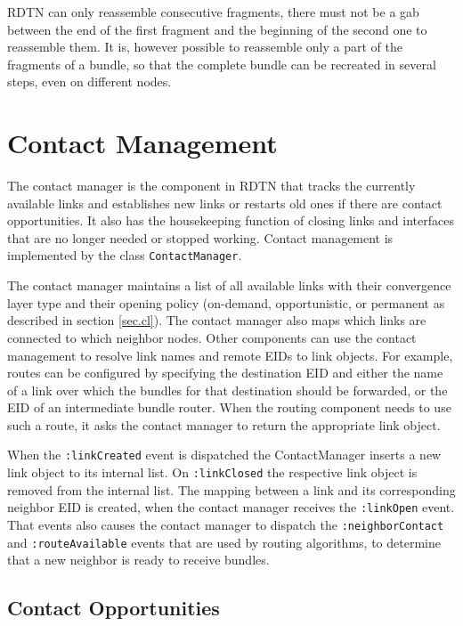 \documentclass[a4paper]{article}
\begin{document}
RDTN can only reassemble consecutive fragments, there must not be a gab
between the end of the first fragment and the beginning of the second one to
reassemble them. It is, however possible to reassemble only a part of the
fragments of a bundle, so that the complete bundle can be recreated in several
steps, even on different nodes.

\section{Contact Management}\label{sec.contact-mngt}

The contact manager is the component in RDTN that tracks the currently available
links and establishes new links or restarts old ones if there are contact
opportunities. It also has the housekeeping function of closing links and
interfaces that are no longer needed or stopped working. Contact management is
implemented by the class {\tt ContactManager}.

The contact manager maintains a list of all available links with their
convergence layer type and their opening policy (on-demand, opportunistic, or
permanent as described in section \ref{sec.cl}). The contact manager also maps
which links are connected to which neighbor nodes. Other components can use the
contact management to resolve link names and remote EIDs to link objects. For
example, routes can be configured by specifying the destination EID and either
the name of a link over which the bundles for that destination should be
forwarded, or the EID of an intermediate bundle router. When the routing
component needs to use such a route, it asks the contact manager to return the
appropriate link object.

When the {\tt :linkCreated} event is dispatched the ContactManager inserts a new
link object to its internal list.  On {\tt :linkClosed} the respective link
object is removed from the internal list. The mapping between a link and its
corresponding neighbor EID is created, when the contact manager receives the
{\tt :linkOpen} event. That events also causes the contact manager to dispatch
the {\tt :neighborContact} and {\tt :routeAvailable} events that are used by
routing algorithms, to determine that a new neighbor is ready to receive
bundles.

\subsection{Contact Opportunities}
\end{document}
